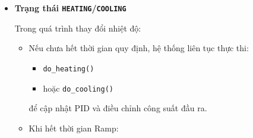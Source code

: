 \begin{itemize}
\begin{itemize}
    \begin{itemize}
        \item Nếu nhiệt độ thấp hơn \textit{setpoint}:
        
        Hệ thống chuyển sang trạng thái:
        \texttt{PREHEAT\_HEAT},
        
        đồng thời khởi tạo bộ PID và cấu hình bộ điều khiển cho Heater.
        
        \item Nếu nhiệt độ cao hơn \textit{setpoint}:
        
        Hệ thống chuyển sang trạng thái:
        \texttt{PREHEAT\_COOL},
        
        đồng thời khởi tạo bộ PID và cấu hình điều khiển cho TEC.
    \end{itemize}
    
    Giai đoạn này kết thúc khi hệ thống nhận:
    
    \begin{itemize}
        \item \texttt{PROFILE\_EVENT\_START}
    \end{itemize}
    
    Sau đó, hệ thống gọi:
    
    \begin{center}
        \texttt{enter\_profile\_check()}
    \end{center}
    
    để điều phối các trạng thái vận hành tiếp theo.

    \item \textbf{Trạng thái \texttt{HEATING}/\texttt{COOLING}}
    
    Trong quá trình thay đổi nhiệt độ:
    
    \begin{itemize}
        \item Nếu chưa hết thời gian quy định, hệ thống liên tục thực thi:
        
        \begin{itemize}
            \item \texttt{do\_heating()}
            \item hoặc \texttt{do\_cooling()}
        \end{itemize}
        
        để cập nhật PID và điều chỉnh công suất đầu ra.
        
        \item Khi hết thời gian Ramp:
        

\end{itemize}
\end{itemize}
\end{itemize}
